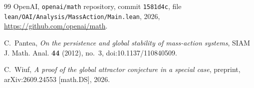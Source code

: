 \documentclass[11pt]{article}
\newcommand{\lean}[1]{\texttt{#1}}
\theoremstyle{plain}
\theoremstyle{definition}
\theoremstyle{remark}
\begin{document}
\begin{thebibliography}{99}
OpenAI, \lean{openai/math} repository, commit \lean{1581d4c}, file \lean{lean/\allowbreak OAI/\allowbreak Analysis/\allowbreak MassAction/\allowbreak Main.lean}, 2026, \url{https://github.com/openai/math}.

C.~Pantea, \emph{On the persistence and global stability of mass-action systems}, SIAM J. Math. Anal. \textbf{44} (2012), no.~3, doi:10.1137/110840509.

C.~Wiuf, \emph{A proof of the global attractor conjecture in a special case}, preprint, arXiv:2609.24553 [math.DS], 2026.

\end{thebibliography}
\end{document}
